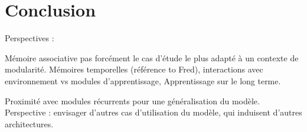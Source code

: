 \section*{Conclusion}



Perspectives : 

Mémoire associative pas forcément le cas d'étude le plus adapté à un contexte de modularité.
Mémoires temporelles (référence to Fred), interactions avec environnement vs modules d'apprentissage, \cite{Ellefsen2015NeuralMH}
Apprentissage sur le long terme.

Proximité avec modules récurrents pour une généralisation du modèle.
Perspective : envisager d'autres cas d'utilisation du modèle, qui induisent d'autres architectures.